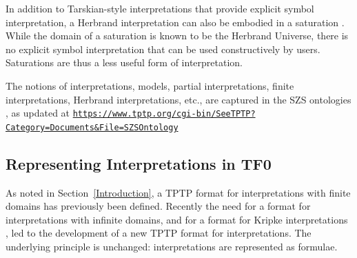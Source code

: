 \documentclass[letterpaper]{article}
\newcommand{\smalltt}[1]{\small \texttt{#1}}
\begin{document}
In addition to Tarskian-style interpretations that provide explicit symbol interpretation, 
a Herbrand interpretation can also be embodied in a saturation \cite{BG+01}.
While the domain of a saturation is known to be the Herbrand Universe, there is no explicit
symbol interpretation that can be used constructively by users.
Saturations are thus a less useful form of interpretation.

The notions of interpretations, models, partial interpretations, finite interpretations,
Herbrand interpretations, etc., are captured in the SZS ontologies \cite{Sut08-KEAPPA}, as
updated at 
{\smalltt{\url{https://www.tptp.org/cgi-bin/SeeTPTP?Category=Documents&File=SZSOntology}}}

 
\subsection{Representing Interpretations in TF0}
\label{InterpretationsTF0}

As noted in Section~\ref{Introduction}, a TPTP format for interpretations with finite domains 
has previously been defined.
Recently the need for a format for interpretations with infinite domains, and for a format for 
Kripke interpretations \cite{Kri63},
led to the development of a new TPTP format for interpretations.
The underlying principle is unchanged: interpretations are represented as formulae.
\end{document}
